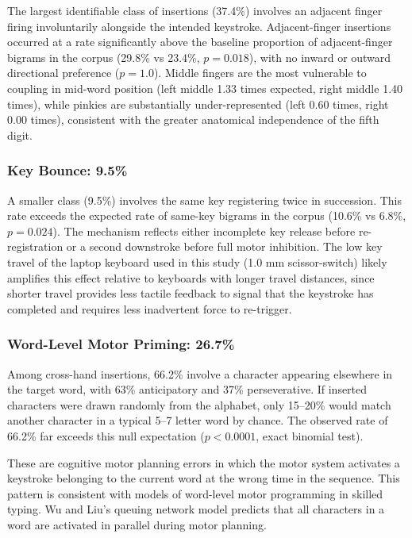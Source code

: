 \documentclass[12pt]{article}
\begin{document}
The largest identifiable class of insertions (37.4\%) involves an adjacent finger firing involuntarily alongside the intended keystroke. Adjacent-finger insertions occurred at a rate significantly above the baseline proportion of adjacent-finger bigrams in the corpus (29.8\% vs 23.4\%, $p = 0.018$), with no inward or outward directional preference ($p = 1.0$). Middle fingers are the most vulnerable to coupling in mid-word position (left middle 1.33 times expected, right middle 1.40 times), while pinkies are substantially under-represented (left 0.60 times, right 0.00 times), consistent with the greater anatomical independence of the fifth digit.

\subsubsection{Key Bounce: 9.5\%}

A smaller class (9.5\%) involves the same key registering twice in succession. This rate exceeds the expected rate of same-key bigrams in the corpus (10.6\% vs 6.8\%, $p = 0.024$). The mechanism reflects either incomplete key release before re-registration or a second downstroke before full motor inhibition. The low key travel of the laptop keyboard used in this study (1.0 mm scissor-switch) likely amplifies this effect relative to keyboards with longer travel distances, since shorter travel provides less tactile feedback to signal that the keystroke has completed and requires less inadvertent force to re-trigger.

\subsubsection{Word-Level Motor Priming: 26.7\%}

Among cross-hand insertions, 66.2\% involve a character appearing elsewhere in the target word, with 63\% anticipatory and 37\% perseverative. If inserted characters were drawn randomly from the alphabet, only 15--20\% would match another character in a typical 5--7 letter word by chance. The observed rate of 66.2\% far exceeds this null expectation ($p < 0.0001$, exact binomial test).

These are cognitive motor planning errors in which the motor system activates a keystroke belonging to the current word at the wrong time in the sequence. This pattern is consistent with models of word-level motor programming in skilled typing. Wu and Liu's \citep{wu2004} queuing network model predicts that all characters in a word are activated in parallel during motor planning.
\end{document}
